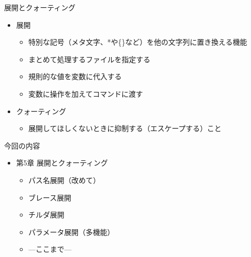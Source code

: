 \documentclass[12pt,aspectratio=169]{beamer}
\begin{document}
\begin{frame}{展開とクォーティング}

  \begin{itemize}
    \item 展開
    \begin{itemize}
      \item 特別な記号（メタ文字、*や\{\}など）を他の文字列に置き換える機能
      \item まとめて処理するファイルを指定する
      \item 規則的な値を変数に代入する
      \item 変数に操作を加えてコマンドに渡す
    \end{itemize}

    \item クォーティング
    \begin{itemize}
      \item 展開してほしくないときに抑制する（エスケープする）こと
    \end{itemize}

  \end{itemize}

\end{frame}


\begin{frame}{今回の内容}

  \begin{itemize}
    \item 第5章 展開とクォーティング
    \begin{itemize}
      \item パス名展開（改めて）
      \item ブレース展開
      \item チルダ展開
      \item パラメータ展開（多機能）
      \item ---ここまで---
    \end{itemize}

  \end{itemize}

\end{frame}
\end{document}
